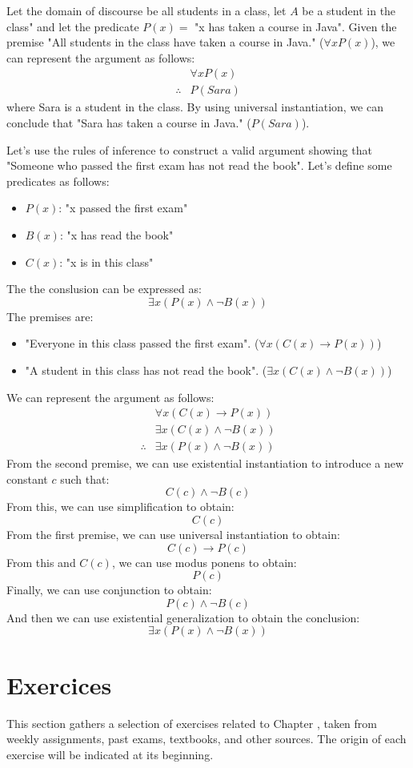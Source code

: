 \begin{eg}
    Let the domain of discourse be all students in a class, let $A$ be a student in the class" and let the predicate $P(x) =$ "x has taken a course in Java". Given the premise "All students in the class have taken a course in Java." ($\forall x P(x)$), we can represent the argument as follows:
    \[
        \begin{array}{rl}
            & \forall x P(x) \\
            \hline
            \therefore & P(Sara)
        \end{array}
    \]
    where Sara is a student in the class. By using universal instantiation, we can conclude that "Sara has taken a course in Java." ($P(Sara)$).
\end{eg}

\begin{eg}
    Let's use the rules of inference to construct a valid argument showing that "Someone who passed the first exam has not read the book". Let's define some predicates as follows:
    \begin{itemize}[itemsep=1pt,label=$\circ$]
        \item $P(x)$: "x passed the first exam"
        \item $B(x)$: "x has read the book"
        \item $C(x)$: "x is in this class"
    \end{itemize}
    The the conslusion can be expressed as:
    \[
        \exists x (P(x) \land \neg B(x))
    \]
    The premises are:
    \begin{itemize}[itemsep=1pt,label=$\circ$]
        \item "Everyone in this class passed the first exam". ($\forall x (C(x) \to P(x))$)
        \item "A student in this class has not read the book". ($\exists x (C(x) \land \neg B(x))$)
    \end{itemize}
    We can represent the argument as follows:
    \[
        \begin{array}{rl}
            & \forall x (C(x) \to P(x)) \\
            & \exists x (C(x) \land \neg B(x)) \\
            \hline
            \therefore & \exists x (P(x) \land \neg B(x))
        \end{array}
    \]
    From the second premise, we can use existential instantiation to introduce a new constant $c$ such that:
    \[
        C(c) \land \neg B(c)
    \]
    From this, we can use simplification to obtain:
    \[
        C(c)
    \]
    From the first premise, we can use universal instantiation to obtain:
    \[
        C(c) \to P(c)
    \]
    From this and $C(c)$, we can use modus ponens to obtain:
    \[
        P(c)
    \]
    Finally, we can use conjunction to obtain:
    \[
        P(c) \land \neg B(c)
    \]
    And then we can use existential generalization to obtain the conclusion:
    \[
        \exists x (P(x) \land \neg B(x))
    \]
\end{eg}

\section{Exercices}
This section gathers a selection of exercises related to Chapter \thechapter, taken from weekly assignments, past exams, textbooks, and other sources. The origin of each exercise will be indicated at its beginning.